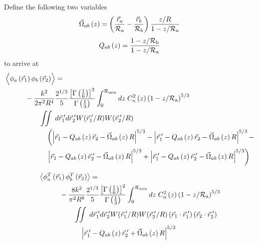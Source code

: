 Define the following two variables
\begin{equation}\label{eqn:Omega}
\vec{\Omega}_{ab}\left(z\right) = 
\left(\frac{\vec{r}_{a}}{\mathcal{R}_{a}} - \frac{\vec{r}_{b}}{\mathcal{R}_{b}} \right) \frac{z/R}{1-z/\mathcal{R}_{\rm a}}
\end{equation}
\begin{equation}\label{eqn:Q}
Q_{ab}\left(z\right) =  
\frac{1 - z/\mathcal{R}_{\rm b}}{1-z/\mathcal{R}_{\rm a}}
\end{equation}
to arrive at
\begin{equation}\label{eqn:prphase_n6}
\begin{aligned}
&\left\langle \vphantom{\hat{\phi}_{a}} \phi_{a}\left(\vec{r}_{1}\right) \phi_{b}\left(\vec{r}_{2}\right)\right\rangle = \\
&\quad\quad\quad
-\frac{k^{2}}{2\pi^{2}R^{4}} 
\frac{2^{1/3}}{5}\frac{\left[\Gamma\left(\frac{1}{6}\right)\right]^{2}}{\Gamma\left(\frac{1}{3}\right)} 
\int_{0}^{\mathcal{R}_{\rm min}} dz\;C_{n}^{2}\left(z\right) 
\left(1 - z/\mathcal{R}_{\rm a}\right)^{5/3}\\
&\quad\quad\quad\quad\quad
\iint \; d\vec{r}^{\;\prime}_{1}d\vec{r}^{\;\prime}_{2}  
W(\vec{r}^{\;\prime}_{1}/R) W(\vec{r}^{\;\prime}_{2}/R) \\
&\quad\quad\quad\quad\quad\quad
\left(\left\vert \vec{r}_{1}  - Q_{ab}\left(z\right)\vec{r}_{2} - \vec{\Omega}_{ab}\left(z\right)R\right\vert^{5/3} -
\left\vert \vec{r}^{\;\prime}_{1}  - Q_{ab}\left(z\right)\vec{r}_{2} - \vec{\Omega}_{ab}\left(z\right)R\right\vert^{5/3} -
\right. \\
& \quad\quad\quad\quad\quad\quad
\left.
\left\vert \vec{r}_{1}  - Q_{ab}\left(z\right)\vec{r}^{\;\prime}_{2} - \vec{\Omega}_{ab}\left(z\right)R\right\vert^{5/3} + 
\left\vert \vec{r}^{\;\prime}_{1}  - Q_{ab}\left(z\right)\vec{r}^{\;\prime}_{2} - \vec{\Omega}_{ab}\left(z\right)R\right\vert^{5/3}\right)
\end{aligned}
\end{equation}

\begin{equation}\label{eqn:tphase_n6}
\begin{aligned}
&\left\langle \phi^{T}_{a}\left(\vec{r}_{1}\right) \phi^{T}_{b}\left(\vec{r}_{2}\right)\right\rangle = \\
&\quad\quad\quad
-\frac{8k^{2}}{\pi^{2}R^{8}} 
\frac{2^{1/3}}{5}\frac{\left[\Gamma\left(\frac{1}{6}\right)\right]^{2}}{\Gamma\left(\frac{1}{3}\right)} 
\int_{0}^{\mathcal{R}_{\rm min}} dz\;C_{n}^{2}\left(z\right) 
\left(1 - z/\mathcal{R}_{\rm a}\right)^{5/3}\\
&\quad\quad\quad\quad\quad
\iint \; d\vec{r}^{\;\prime}_{1}d\vec{r}^{\;\prime}_{2} W(\vec{r}^{\;\prime}_{1}/R) W(\vec{r}^{\;\prime}_{2}/R)
\left(\vec{r}_{1} \cdot \vec{r}^{\;\prime}_{1}\right)
\left(\vec{r}_{2} \cdot \vec{r}^{\;\prime}_{2}\right)
\\
&\quad\quad\quad\quad\quad\quad
\left\vert \vec{r}^{\;\prime}_{1} - Q_{ab}\left(z\right) \vec{r}^{\;\prime}_{2} + \vec{\Omega}_{ab}\left(z\right) R\right\vert^{5/3}
\end{aligned}
\end{equation}

